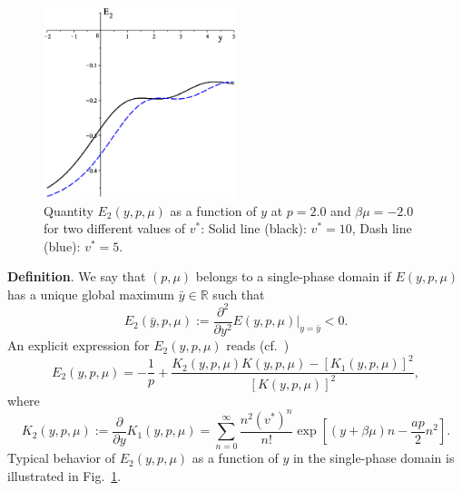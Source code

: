 \documentclass[12pt]{article}
\numberwithin{equation}{section}
\begin{document}
	\begin{figure}[htbp]
		\includegraphics[width=0.5\textwidth,angle=0]{E2_vs_y}
		\centering
		\captionsetup{width=0.6\textwidth}
		\caption{Quantity $E_2(y,p,\mu)$ as a function of $y$ at $p=2.0$ and $\beta\mu=-2.0$ for two different values of $v^*$: Solid line (black): $v^* = 10$, Dash line (blue): $v^* = 5$.}
		\label{fig:E2_vs_y}
	\end{figure}
	
	\textbf{Definition}. We say that $(p, \mu)$ belongs to a single-phase domain if $E(y,p,\mu)$ has a unique global maximum $\bar{y} \in \mathbb{R}$ such that
	\begin{equation}
		E_2(\bar{y}, p, \mu) := \frac{\partial^2}{\partial y^2} E(y,p,\mu)\big|_{y=\bar{y}} < 0.
	\end{equation}
	An explicit expression for $E_2(y,p,\mu)$ reads (cf.~\cite[(20)]{KD22})
	\begin{equation}
		E_2(y,p,\mu) = -\frac{1}{p} + \frac{K_2(y,p,\mu) K(y,p,\mu) - [K_1(y,p,\mu)]^2}{[K(y,p,\mu)]^2},
	\end{equation}
	where
	\begin{equation}
		K_2(y,p,\mu) := \frac{\partial}{\partial y} K_1(y,p,\mu) = \sum_{n=0}^{\infty} \frac{n^2 (v^*)^n}{n!} \exp[(y+\beta\mu)n - \frac{ap}{2}n^2].
	\end{equation}
	Typical behavior of $E_2(y,p,\mu)$ as a function of $y$ in the single-phase domain is illustrated in Fig.~\ref{fig:E2_vs_y}.
	
\end{document}
